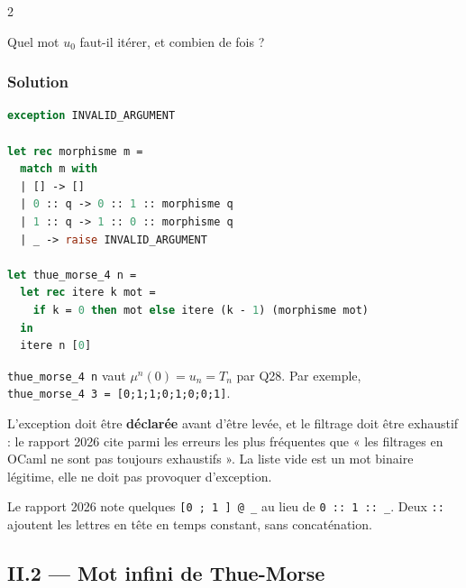 \documentclass[11pt,a4paper]{article}
\begin{document}
\begin{indication}{2}

Quel mot \(u_0\) faut-il itérer, et combien de fois ?

\end{indication}

\hypertarget{solution-28}{%
\subsubsection{Solution}\label{solution-28}}

\begin{lstlisting}[language=Caml]
exception INVALID_ARGUMENT

let rec morphisme m =
  match m with
  | [] -> []
  | 0 :: q -> 0 :: 1 :: morphisme q
  | 1 :: q -> 1 :: 0 :: morphisme q
  | _ -> raise INVALID_ARGUMENT

let thue_morse_4 n =
  let rec itere k mot =
    if k = 0 then mot else itere (k - 1) (morphisme mot)
  in
  itere n [0]
\end{lstlisting}

\texttt{thue\_morse\_4\ n} vaut \(\mu^n(0)=u_n=T_n\) par Q28. Par exemple, \texttt{thue\_morse\_4\ 3\ =\allowbreak{}\ {[}0;\allowbreak{}1;\allowbreak{}1;\allowbreak{}0;\allowbreak{}1;\allowbreak{}0;\allowbreak{}0;\allowbreak{}1{]}\allowbreak{}}.

\begin{piege}

L'exception doit être \textbf{déclarée} avant d'être levée, et le filtrage doit être exhaustif : le rapport 2026 cite parmi les erreurs les plus fréquentes que « les filtrages en OCaml ne sont pas toujours exhaustifs ». La liste vide est un mot binaire légitime, elle ne doit pas provoquer d'exception.

\end{piege}

\begin{jury}

Le rapport 2026 note quelques \texttt{{[}0\ ;\ 1\ {]}\ @\ \_} au lieu de \texttt{0\ ::\ 1\ ::\ \_}. Deux \texttt{::} ajoutent les lettres en tête en temps constant, sans concaténation.

\end{jury}

\hypertarget{ii.2-mot-infini-de-thue-morse}{%
\subsection{II.2 --- Mot infini de Thue-Morse}\label{ii.2-mot-infini-de-thue-morse}}
\end{document}
